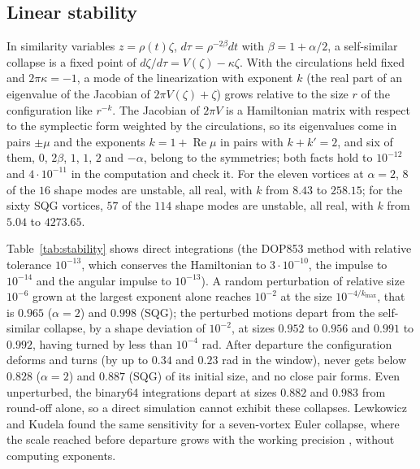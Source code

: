 \documentclass[11pt]{article}
\theoremstyle{definition}
\newcommand{\re}{\operatorname{Re}}
\begin{document}
\subsection{Linear stability}\label{sec:stability}

In similarity variables $z = \rho(t)\zeta$, $d\tau = \rho^{-2\beta}dt$ with $\beta = 1 + \alpha/2$, a self-similar collapse is a fixed point of $d\zeta/d\tau = V(\zeta) - \kappa\zeta$. With the circulations held fixed and $2\pi\kappa = -1$, a mode of the linearization with exponent $k$ (the real part of an eigenvalue of the Jacobian of $2\pi V(\zeta) + \zeta$) grows relative to the size $r$ of the configuration like $r^{-k}$. The Jacobian of $2\pi V$ is a Hamiltonian matrix with respect to the symplectic form weighted by the circulations, so its eigenvalues come in pairs $\pm\mu$ and the exponents $k = 1 + \re\mu$ in pairs with $k + k' = 2$, and six of them, $0$, $2\beta$, $1$, $1$, $2$ and $-\alpha$, belong to the symmetries; both facts hold to $10^{-12}$ and $4 \cdot 10^{-11}$ in the computation and check it. For the eleven vortices at $\alpha = 2$, $8$ of the $16$ shape modes are unstable, all real, with $k$ from $8.43$ to $258.15$; for the sixty SQG vortices, $57$ of the $114$ shape modes are unstable, all real, with $k$ from $5.04$ to $4273.65$.

Table~\ref{tab:stability} shows direct integrations (the DOP853 method with relative tolerance $10^{-13}$, which conserves the Hamiltonian to $3 \cdot 10^{-10}$, the impulse to $10^{-14}$ and the angular impulse to $10^{-13}$). A random perturbation of relative size $10^{-6}$ grown at the largest exponent alone reaches $10^{-2}$ at the size $10^{-4/k_{\max}}$, that is $0.965$ ($\alpha = 2$) and $0.998$ (SQG); the perturbed motions depart from the self-similar collapse, by a shape deviation of $10^{-2}$, at sizes $0.952$ to $0.956$ and $0.991$ to $0.992$, having turned by less than $10^{-4}$ rad. After departure the configuration deforms and turns (by up to $0.34$ and $0.23$ rad in the window), never gets below $0.828$ ($\alpha = 2$) and $0.887$ (SQG) of its initial size, and no close pair forms. Even unperturbed, the binary64 integrations depart at sizes $0.882$ and $0.983$ from round-off alone, so a direct simulation cannot exhibit these collapses. Lewkowicz and Kudela found the same sensitivity for a seven-vortex Euler collapse, where the scale reached before departure grows with the working precision \cite{lk2015}, without computing exponents.
\end{document}
